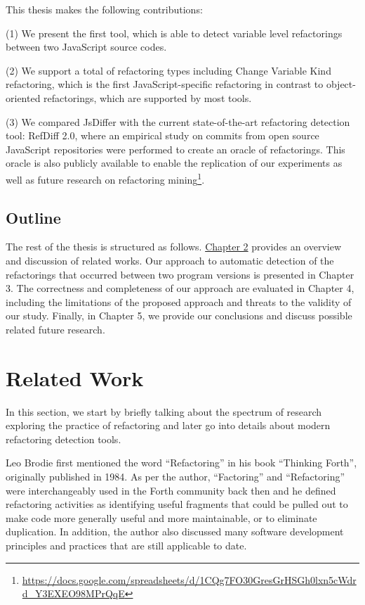 \documentclass[letterpaper,12pt,onecolumn,final]{report}
\begin{document}
This thesis makes the following contributions:

(1) We present the first tool, which is able to detect variable level refactorings between two JavaScript source codes.

(2) We support a total of \supportedRefTypesJsDiffer{} refactoring types including Change Variable Kind refactoring, which is the first JavaScript-specific refactoring in contrast to object-oriented refactorings, which are supported by most tools.

(3) We compared JsDiffer with the current state-of-the-art refactoring detection tool: RefDiff 2.0, where an empirical study on \evTotalCommits{} commits from \evTotalProjectCounts{} open source JavaScript repositories were performed to create an oracle of \oracleValidatedInstances{} refactorings. This oracle is also publicly available to enable the replication of our experiments as well as future research on refactoring mining\footnote{\url{https://docs.google.com/spreadsheets/d/1CQg7FO30GresGrHSGh0lxn5cWdrd_Y3EXEO98MPrQqE}}.


\section{Outline}
\label{sec:outline}
The rest of the thesis is structured as follows. \hyperref[chap:relatedWork]{Chapter 2}  provides an overview and discussion of related works. Our approach to automatic detection of the refactorings that occurred between two program versions is presented in Chapter 3. The correctness and completeness of our approach are evaluated in Chapter 4, including the limitations of the proposed approach and threats to the validity of our study. Finally, in Chapter 5, we provide our conclusions and discuss possible related future research.


\chapter{Related Work}
\label{chap:relatedwork}

In this section, we start by briefly talking about the spectrum of research exploring the practice of refactoring and later go into details about modern refactoring detection tools.

Leo Brodie \cite{thinkingforth} first mentioned the word “Refactoring” in his book “Thinking Forth”, originally published in 1984. As per the author, “Factoring” and “Refactoring” were interchangeably used in the Forth community back then and he defined refactoring activities as identifying useful fragments that could be pulled out to make code more generally useful and more maintainable, or to eliminate duplication. In addition, the author also discussed many software development principles and practices that are still applicable to date.
\end{document}
